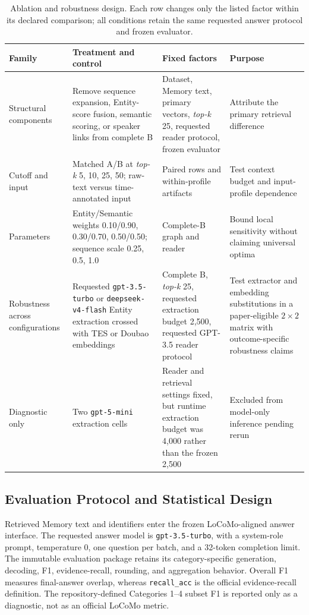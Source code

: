 \documentclass[a4paper,twoside]{article}
\newcommand{\recallacc}{\texttt{recall\_acc}}
\newcommand{\topk}{\textit{top-k}}
\begin{document}
\begin{table}[!t]
\centering
\caption{Ablation and robustness design. Each row changes only the listed
factor within its declared comparison; all conditions retain the same
requested answer protocol and frozen evaluator.}
\label{tab:design}
\begin{tabularx}{\textwidth}{@{}p{}p{}Xp{}@{}}
\toprule
Family & Treatment and control & Fixed factors & Purpose \\
\midrule
Structural components & Remove sequence expansion, Entity-score fusion,
semantic scoring, or speaker links from complete B & Dataset, Memory text,
primary vectors, \topk{} 25, requested reader protocol, frozen evaluator & Attribute the primary
retrieval difference \\
Cutoff and input & Matched A/B at \topk{} 5, 10, 25, 50; raw-text versus
time-annotated input & Paired rows and within-profile artifacts & Test context
budget and input-profile dependence \\
Parameters & Entity/Semantic weights 0.10/0.90, 0.30/0.70, 0.50/0.50;
sequence scale 0.25, 0.5, 1.0 & Complete-B graph and reader & Bound local
sensitivity without claiming universal optima \\
Robustness across configurations & Requested \texttt{gpt-3.5-turbo} or
\texttt{deepseek-v4-flash} Entity extraction crossed with TES or Doubao
embeddings & Complete B,
\topk{} 25, requested extraction budget 2,500, requested GPT-3.5 reader protocol & Test extractor and
embedding substitutions in a paper-eligible $2\times2$ matrix with
outcome-specific robustness claims \\
Diagnostic only & Two \texttt{gpt-5-mini} extraction cells & Reader and
retrieval settings fixed, but runtime extraction budget was 4,000 rather than
the frozen 2,500 & Excluded from model-only inference pending rerun \\
\bottomrule
\end{tabularx}
\end{table}

\subsection{Evaluation Protocol and Statistical Design}

Retrieved Memory text and identifiers enter the frozen LoCoMo-aligned answer
interface. The requested answer model is \texttt{gpt-3.5-turbo}, with a
system-role prompt, temperature 0, one question per batch, and a 32-token
completion limit. The immutable evaluation package retains its
category-specific generation, decoding, F1, evidence-recall, rounding, and
aggregation behavior. Overall F1 measures final-answer overlap, whereas
\recallacc{} is the official evidence-recall definition. The
repository-defined Categories 1--4 subset F1 is reported only as a diagnostic,
not as an official LoCoMo metric.
\end{document}
